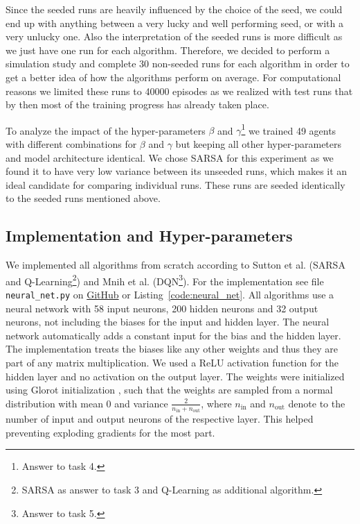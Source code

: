 \documentclass[conference]{IEEEtran}
\begin{document}
Since the seeded runs are heavily influenced by the choice of the seed, we could end up with anything between a very lucky and well performing seed, or with a very unlucky one. Also the interpretation of the seeded runs is more difficult as we just have one run for each algorithm. Therefore, we decided to perform a simulation study and complete 30 non-seeded runs for each algorithm in order to get a better idea of how the algorithms perform on average. For computational reasons we limited these runs to 40000 episodes as we realized with test runs that by then most of the training progress has already taken place.

To analyze the impact of the hyper-parameters $\beta$ and $\gamma$\footnote{Answer to task 4.} we trained 49 agents with different combinations for $\beta$ and $\gamma$ but keeping all other hyper-parameters and model architecture identical. We chose SARSA for this experiment as we found it to have very low variance between its unseeded runs, which makes it an ideal candidate for comparing individual runs. These runs are seeded identically to the seeded runs mentioned above.




\subsection{Implementation and Hyper-parameters}\label{sec:implementation_hyper-parameters}



We implemented all algorithms from scratch according to Sutton et al. \cite{sutton2018} (SARSA and Q-Learning\footnote{SARSA as answer to task 3 and Q-Learning as additional algorithm.}) and Mnih et al. \cite{dqn2015} (DQN\footnote{Answer to task 5.}). For the implementation see file \verb"neural_net.py" on \href{https://github.com/TwoDigitsOneNumber/IntroRL_ChessAssignment}{GitHub} or Listing~\ref{code:neural_net}. All algorithms use a neural network with 58 input neurons, 200 hidden neurons and 32 output neurons, not including the biases for the input and hidden layer. The neural network automatically adds a constant input for the bias and the hidden layer. 
The implementation treats the biases like any other weights and thus they are part of any matrix multiplication. We used a ReLU activation function for the hidden layer and no activation on the output layer.
The weights were initialized using Glorot initialization \cite{glorot2010}, such that the weights are sampled from a normal distribution with mean 0 and variance $\frac{2}{n_{\text{in}} + n_{\text{out}}}$, where $n_\text{in}$ and $n_\text{out}$ denote to the number of input and output neurons of the respective layer. This helped preventing exploding gradients for the most part.
\end{document}
